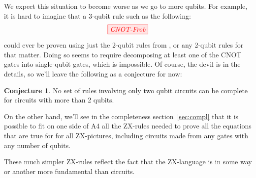 \documentclass[11pt]{article}
\theoremstyle{definition}
\newtheorem{conj}[theorem]{Conjecture}
\def\bR{\begin{color}{red}}
\def\e{\end{color}\xspace}
\newcommand{\TODOb}[1]{\marginpar{\scriptsize\bR \textbf{TODO:} #1\e}}
\begin{document}
We expect this situation to become worse as we go to more qubits. For example, it is hard to imagine that a 3-qubit rule such as the following:
\begin{equation}\label{eq:3qubit}
\tikzfig{CNOT-Frob}
\end{equation}
could ever be proven using just the 2-qubit rules from \cite{ptbian, DBLP:conf/rc/CoeckeW18}, or any 2-qubit rules for that matter. Doing so seems to require decomposing at least one of the CNOT gates into single-qubit gates, which is impossible. Of course, the devil is in the details, so we'll leave the following as a conjecture for now:

\begin{conj}
No set of rules involving only two qubit circuits can be complete for circuits with more than 2 qubits.
\end{conj}

On the other hand, we'll see in the completeness section~\ref{sec:compl} that it is possible to fit on one side of A4 all the ZX-rules needed to prove all the equations that are true for for all ZX-pictures, including circuits made from any gates with any number of qubits.



 

These much simpler ZX-rules reflect the fact that the ZX-language is in some way or another more fundamental than circuits.

\end{document}
